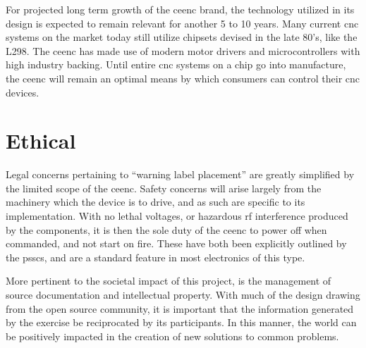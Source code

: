 For projected long term growth of the \gls{ceenc} brand, the technology utilized in its design is expected to remain relevant for another 5 to 10 years.
Many current \gls{cnc} systems on the market today still utilize chipsets devised in the late 80's, like the L298. 
The \gls{ceenc} has made use of modern motor drivers and microcontrollers with high industry backing.
Until entire \gls{cnc} systems on a chip go into manufacture, the \gls{ceenc} will remain an optimal means by which consumers can control their \gls{cnc} devices.
 
\section{Ethical}
Legal concerns pertaining to “warning label placement” are greatly simplified by the limited scope of the \gls{ceenc}. 
Safety concerns will arise largely from the machinery which the device is to drive, and as such are specific to its implementation. 
With no lethal voltages, or hazardous \gls{rf} interference produced by the components, it is then the sole duty of the \gls{ceenc} to power off when commanded, and not start on fire. 
These have both been explicitly outlined by the \gls{pssc}s, and are a standard feature in most electronics of this type.

More pertinent to the societal impact of this project, is the management of source documentation and intellectual property. 
With much of the design drawing from the open source community, it is important that the information generated by the exercise be reciprocated by its participants. 
In this manner, the world can be positively impacted in the creation of new solutions to common problems. 

